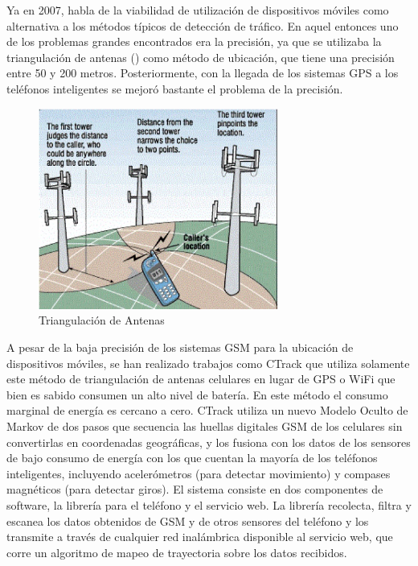 Ya en 2007, \cite{fraser2007use} habla de la viabilidad de utilización de dispositivos móviles como alternativa a los métodos típicos de detección de tráfico. En aquel entonces uno de los problemas grandes encontrados era la precisión, ya que se utilizaba la triangulación de antenas () como método de ubicación, que tiene una precisión entre 50 y 200 metros. Posteriormente, con la llegada de los sistemas GPS a los teléfonos inteligentes se mejoró bastante el problema de la precisión.

\begin{figure}[h]
	\centering
	\includegraphics[width=0.7\textwidth]{capitulos/3/figuras/figura5.jpg}
	\caption{\label{fig:triangulacionAntenas} Triangulación de Antenas}	
\end{figure}

A pesar de la baja precisión de los sistemas GSM para la ubicación de dispositivos móviles, se han realizado trabajos como CTrack \cite{thiagarajan2011accurate} que utiliza solamente este método de triangulación de antenas celulares en lugar de GPS o WiFi que bien es sabido consumen un alto nivel de batería. En este método el consumo marginal de energía es cercano a cero. CTrack utiliza un nuevo Modelo Oculto de Markov de dos pasos que secuencia las huellas digitales GSM de los celulares sin convertirlas en coordenadas geográficas, y los fusiona con los datos de los sensores de bajo consumo de energía con los que cuentan la mayoría de los teléfonos inteligentes, incluyendo acelerómetros (para detectar movimiento) y compases magnéticos (para detectar giros). El sistema consiste en dos componentes de software, la librería para el teléfono y el servicio web. La librería recolecta, filtra y escanea los datos obtenidos de GSM y de otros sensores del teléfono y los transmite a través de cualquier red inalámbrica disponible al servicio web, que corre un algoritmo de mapeo de trayectoria sobre los datos recibidos.


